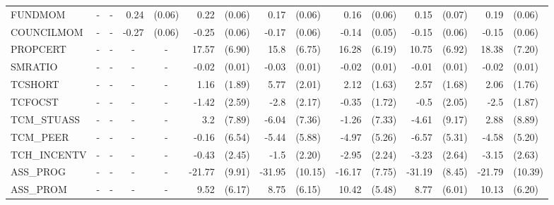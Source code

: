 \documentclass[12pt]{article}%
\begin{document}
\begin{table}[H]
\begin{tabular}{lrlrlrlrlrlrlrl}
			FUNDMOM & \multicolumn{1}{c}{-} & \multicolumn{1}{c}{-} & 0.24  & (0.06) & 0.22  & (0.06) & 0.17  & (0.06) & 0.16  & (0.06) & 0.15  & (0.07) & 0.19  & (0.06) \\[0.2em]
			COUNCILMOM & \multicolumn{1}{c}{-} & \multicolumn{1}{c}{-} & -0.27 & (0.06) & -0.25 & (0.06) & -0.17 & (0.06) & -0.14 & (0.05) & -0.15 & (0.06) & -0.15 & (0.06) \\[0.2em]
			PROPCERT & \multicolumn{1}{c}{-} & \multicolumn{1}{c}{-} & \multicolumn{1}{c}{-} & \multicolumn{1}{c}{-} & 17.57 & (6.90) & 15.8  & (6.75) & 16.28 & (6.19) & 10.75 & (6.92) & 18.38 & (7.20) \\[0.2em]
			SMRATIO & \multicolumn{1}{c}{-} & \multicolumn{1}{c}{-} & \multicolumn{1}{c}{-} & \multicolumn{1}{c}{-} & -0.02 & (0.01) & -0.03 & (0.01) & -0.02 & (0.01) & -0.01 & (0.01) & -0.02 & (0.01) \\[0.2em]
			TCSHORT & \multicolumn{1}{c}{-} & \multicolumn{1}{c}{-} & \multicolumn{1}{c}{-} & \multicolumn{1}{c}{-} & 1.16  & (1.89) & 5.77  & (2.01) & 2.12  & (1.63) & 2.57  & (1.68) & 2.06  & (1.76) \\[0.2em]
			TCFOCST & \multicolumn{1}{c}{-} & \multicolumn{1}{c}{-} & \multicolumn{1}{c}{-} & \multicolumn{1}{c}{-} & -1.42 & (2.59) & -2.8  & (2.17) & -0.35 & (1.72) & -0.5  & (2.05) & -2.5  & (1.87) \\[0.2em]
			TCM\_STUASS & \multicolumn{1}{c}{-} & \multicolumn{1}{c}{-} & \multicolumn{1}{c}{-} & \multicolumn{1}{c}{-} & 3.2   & (7.89) & -6.04 & (7.36) & -1.26 & (7.33) & -4.61 & (9.17) & 2.88  & (8.89) \\[0.2em]
			TCM\_PEER & \multicolumn{1}{c}{-} & \multicolumn{1}{c}{-} & \multicolumn{1}{c}{-} & \multicolumn{1}{c}{-} & -0.16 & (6.54) & -5.44 & (5.88) & -4.97 & (5.26) & -6.57 & (5.31) & -4.58 & (5.20) \\[0.2em]
			TCH\_INCENTV & \multicolumn{1}{c}{-} & \multicolumn{1}{c}{-} & \multicolumn{1}{c}{-} & \multicolumn{1}{c}{-} & -0.43 & (2.45) & -1.5  & (2.20) & -2.95 & (2.24) & -3.23 & (2.64) & -3.15 & (2.63) \\[0.2em]
			ASS\_PROG & \multicolumn{1}{c}{-} & \multicolumn{1}{c}{-} & \multicolumn{1}{c}{-} & \multicolumn{1}{c}{-} & -21.77 & (9.91) & -31.95 & (10.15) & -16.17 & (7.75) & -31.19 & (8.45) & -21.79 & (10.39) \\[0.2em]
			ASS\_PROM & \multicolumn{1}{c}{-} & \multicolumn{1}{c}{-} & \multicolumn{1}{c}{-} & \multicolumn{1}{c}{-} & 9.52  & (6.17) & 8.75  & (6.15) & 10.42 & (5.48) & 8.77  & (6.01) & 10.13 & (6.20) \\[0.2em]

\end{tabular}
\end{table}
\end{document}
